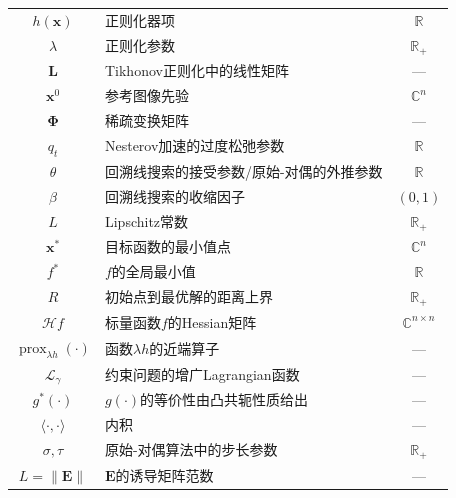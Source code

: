 \documentclass[12pt]{article}
\begin{document}
\begin{table}[ht]
\begin{tabularx}{\textwidth}{c X c}
        $h(\bm{x})$ & 正则化器项 & $\mathbb{R}$ \\
        $\lambda$ & 正则化参数 & $\mathbb{R}_+$ \\
        $\mathbf{L}$ & Tikhonov正则化中的线性矩阵 & --- \\
        $\bm{x}^0$ & 参考图像先验 & $\mathbb{C}^n$ \\
        $\bm{\Phi}$ & 稀疏变换矩阵 & --- \\
        $q_t$ & Nesterov加速的过度松弛参数 & $\mathbb{R}$ \\
        $\theta$ & 回溯线搜索的接受参数/原始-对偶的外推参数 & $\mathbb{R}$ \\
        $\beta$ & 回溯线搜索的收缩因子 & $(0,1)$ \\
        $L$ & Lipschitz常数 & $\mathbb{R}_+$ \\
        $\bm{x}^*$ & 目标函数的最小值点 & $\mathbb{C}^n$ \\
        $f^*$ & $f$的全局最小值 & $\mathbb{R}$ \\
        $R$ & 初始点到最优解的距离上界 & $\mathbb{R}_+$ \\
        $\mathcal{H}f$ & 标量函数$f$的Hessian矩阵 & $\mathbb{C}^{n\times n}$ \\
        $\operatorname{prox}_{\lambda h}(\cdot)$ & 函数$\lambda h$的近端算子 & --- \\
        $\mathcal{L}_\gamma$ & 约束问题的增广Lagrangian函数 & --- \\
        $g^*(\cdot)$ & $g(\cdot)$的等价性由凸共轭性质给出 & --- \\
        $\langle\cdot,\cdot\rangle$ & 内积 & --- \\
        $\sigma, \tau$ & 原始-对偶算法中的步长参数 & $\mathbb{R}_+$ \\
        $L = \|\mathbf{E}\|$ & $\mathbf{E}$的诱导矩阵范数 & --- \\
        \bottomrule
    \end{tabularx}
\end{table}

\newpage
\end{document}
